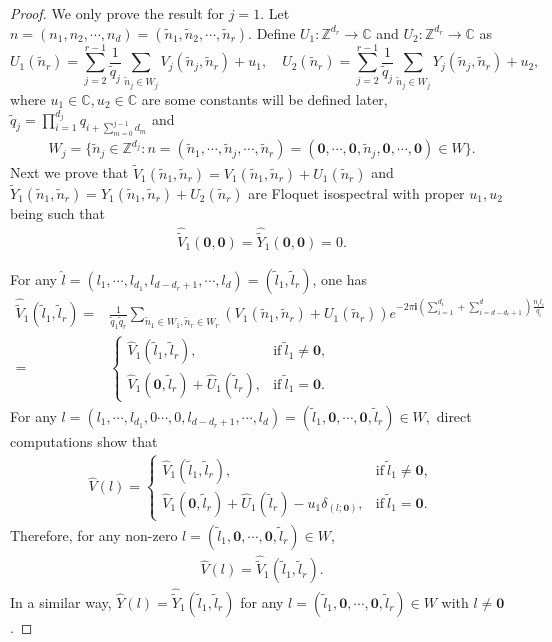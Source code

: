 \documentclass[12pt,letterpaper]{amsart}
\def\C{{\mathbb C}}
\begin{document}
\begin{proof}We only prove the result for $j=1$. Let $n=(n_1,n_2,\cdots,n_d)=(\tilde{n}_1,\tilde{n}_2,\cdots,\tilde{n}_r)$.
Define $U_1:\mathbb{Z}^{d_r}\to\mathbb{C}$ and $U_2:\mathbb{Z}^{d_r}\to\mathbb{C}$ as
\[U_1(\tilde{n}_r)=\sum_{j=2}^{r-1}\frac{1}{\tilde{q}_j}\sum_{\tilde{n}_j\in W_j}V_j(\tilde{n}_j,\tilde{n}_r)+u_1,\quad
U_2(\tilde{n}_r)=\sum_{j=2}^{r-1}\frac{1}{\tilde{q}_j}\sum_{\tilde{n}_j\in W_j}Y_j(\tilde{n}_j,\tilde{n}_r)+u_2,\]
where $u_1\in\C,u_2\in\C$ are some constants will be defined later,
$\tilde{q}_j=\prod_{i=1}^{d_j}q_{i+\sum_{m=0}^{j-1}d_m}$ and
\begin{align}
W_j=\Big\{\tilde{n}_j\in \mathbb{Z}^{d_j}:n=(\tilde{n}_1,\cdots,\tilde{n}_j,\cdots,\tilde{n}_r)=(\mathbf{0},\cdots,\mathbf{0},\tilde{n}_j,\mathbf{0},\cdots,\mathbf{0})\in W\Big\}.\nonumber
\end{align}
Next we prove that $\tilde{V}_1(\tilde{n}_1,\tilde{n}_r)=V_1(\tilde{n}_1,\tilde{n}_r)+U_1(\tilde{n}_r)$ and $\tilde{Y}_1(\tilde{n}_1,\tilde{n}_r)=Y_1(\tilde{n}_1,\tilde{n}_r)+U_2(\tilde{n}_r)$ are Floquet isospectral with proper $u_1,u_2$ being such that
\begin{align}
\hat{\tilde{V}}_1(\mathbf{0},\mathbf{0})=\hat{\tilde{Y}}_1(\mathbf{0},\mathbf{0})=0.\label{mathbf00vy}
\end{align}

For any $\hat{l}=(l_1,\cdots,l_{d_1},l_{d-d_r+1},\cdots,l_d)=(\tilde{l}_1,\tilde{l}_r)$, one has
\begin{align}
\hat{\tilde{V}}_1(\tilde{l}_1,\tilde{l}_r)=&\frac{1}{\tilde{q}_1\tilde{q}_r}\sum_{\tilde{n}_1\in W_1,\tilde{n}_r\in W_r}\left(V_1(\tilde{n}_1,\tilde{n}_r)+U_1(\tilde{n}_r)\right)e^{-2\pi\mathbf{i}\left(\sum_{i=1}^{d_1}+\sum_{i=d-d_r+1}^d\right)\frac{n_il_i}{q_i}}\nonumber\\
=&\begin{cases}
\hat{V}_1(\tilde{l}_1,\tilde{l}_r),&\mathrm{if}\ \tilde{l}_1\neq\mathbf{0},\\
\hat{V}_1(\mathbf{0},\tilde{l}_r)+\hat{U}_1(\tilde{l}_r),&\mathrm{if}\ \tilde{l}_1=\mathbf{0}.
\end{cases}\nonumber
\end{align}
For any $l=(l_1,\cdots,l_{d_1},0\cdots,0,l_{d-d_r+1},\cdots,l_d)=(\tilde{l}_1,\mathbf{0},\cdots,\mathbf{0},\tilde{l}_r)\in W,$
direct computations show that
\begin{align}
\hat{V}(l)=\begin{cases}
\hat{V}_1(\tilde{l}_1,\tilde{l}_r),&\mathrm{if}\ \tilde{l}_1\neq\mathbf{0},\\
\hat{V}_1(\mathbf{0},\tilde{l}_r)+\hat{U}_1(\tilde{l}_r)-u_1\delta_{(l;\mathbf{0})},&\mathrm{if}\ \tilde{l}_1=\mathbf{0}.
\end{cases}\nonumber
\end{align}
{Therefore, for any non-zero $l=(\tilde{l}_1,\mathbf{0},\cdots,\mathbf{0},\tilde{l}_r)\in W$,
\begin{align}
\hat{V}(l)=\hat{\tilde{V}}_1(\tilde{l}_1,\tilde{l}_r).\label{vhatequalvtildehat}
\end{align}
In a similar way,
$\hat{Y}(l)=\hat{\tilde{Y}}_1(\tilde{l}_1,\tilde{l}_r)$ for any $l=(\tilde{l}_1,\mathbf{0},\cdots,\mathbf{0},\tilde{l}_r)\in W$ with $l\neq \mathbf{0}$.}


\end{proof}
\end{document}

